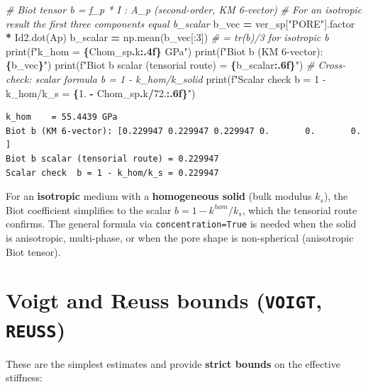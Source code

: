 \documentclass[
  a4paper,
  numbers=noendperiod,
  DIV=12]{scrreprt}
\newenvironment{Shaded}{\begin{snugshade}}{\end{snugshade}}
\newcommand{\BuiltInTok}[1]{#1}
\newcommand{\CommentTok}[1]{\textcolor[rgb]{0.56,0.35,0.01}{\textit{#1}}}
\newcommand{\DecValTok}[1]{\textcolor[rgb]{0.00,0.00,0.81}{#1}}
\newcommand{\FloatTok}[1]{\textcolor[rgb]{0.00,0.00,0.81}{#1}}
\newcommand{\NormalTok}[1]{#1}
\newcommand{\OperatorTok}[1]{\textcolor[rgb]{0.81,0.36,0.00}{\textbf{#1}}}
\newcommand{\SpecialCharTok}[1]{\textcolor[rgb]{0.81,0.36,0.00}{\textbf{#1}}}
\newcommand{\SpecialStringTok}[1]{\textcolor[rgb]{0.31,0.60,0.02}{#1}}
\newcommand{\StringTok}[1]{\textcolor[rgb]{0.31,0.60,0.02}{#1}}
\begin{document}
\begin{Shaded}
\begin{Highlighting}[]
\CommentTok{\# Biot tensor b = f\_p * I : A\_p  (second{-}order, KM 6{-}vector)}
\CommentTok{\# For an isotropic result the first three components equal b\_scalar}
\NormalTok{b\_vec    }\OperatorTok{=}\NormalTok{ ver\_sp[}\StringTok{"PORE"}\NormalTok{].factor }\OperatorTok{*}\NormalTok{ Id2.dot(Ap)}
\NormalTok{b\_scalar }\OperatorTok{=}\NormalTok{ np.mean(b\_vec[:}\DecValTok{3}\NormalTok{])   }\CommentTok{\# = tr(b)/3 for isotropic b}
\BuiltInTok{print}\NormalTok{(}\SpecialStringTok{f"k\_hom    = }\SpecialCharTok{\{}\NormalTok{Chom\_sp}\SpecialCharTok{.}\NormalTok{k}\SpecialCharTok{:.4f\}}\SpecialStringTok{ GPa"}\NormalTok{)}
\BuiltInTok{print}\NormalTok{(}\SpecialStringTok{f"Biot b (KM 6{-}vector): }\SpecialCharTok{\{}\NormalTok{b\_vec}\SpecialCharTok{\}}\SpecialStringTok{"}\NormalTok{)}
\BuiltInTok{print}\NormalTok{(}\SpecialStringTok{f"Biot b scalar (tensorial route) = }\SpecialCharTok{\{}\NormalTok{b\_scalar}\SpecialCharTok{:.6f\}}\SpecialStringTok{"}\NormalTok{)}
\CommentTok{\# Cross{-}check: scalar formula b = 1 {-} k\_hom/k\_solid}
\BuiltInTok{print}\NormalTok{(}\SpecialStringTok{f"Scalar check  b = 1 {-} k\_hom/k\_s = }\SpecialCharTok{\{}\FloatTok{1.} \OperatorTok{{-}}\NormalTok{ Chom\_sp}\SpecialCharTok{.}\NormalTok{k}\OperatorTok{/}\FloatTok{72.}\SpecialCharTok{:.6f\}}\SpecialStringTok{"}\NormalTok{)}
\end{Highlighting}
\end{Shaded}

\begin{verbatim}
k_hom    = 55.4439 GPa
Biot b (KM 6-vector): [0.229947 0.229947 0.229947 0.       0.       0.      ]
Biot b scalar (tensorial route) = 0.229947
Scalar check  b = 1 - k_hom/k_s = 0.229947
\end{verbatim}

For an \textbf{isotropic} medium with a \textbf{homogeneous solid} (bulk
modulus \(k_s\)), the Biot coefficient simplifies to the scalar
\(b = 1 - k^{hom}/k_s\), which the tensorial route confirms. The general
formula via \texttt{concentration=True} is needed when the solid is
anisotropic, multi-phase, or when the pore shape is non-spherical
(anisotropic Biot tensor).

\section{\texorpdfstring{Voigt and Reuss bounds (\texttt{VOIGT},
\texttt{REUSS})}{Voigt and Reuss bounds (VOIGT, REUSS)}}\label{sec-voigt-reuss}

These are the simplest estimates and provide \textbf{strict bounds} on
the effective stiffness:
\end{document}
